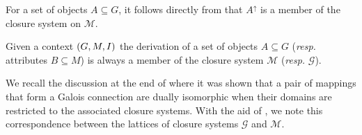 For a set of objects $A \subseteq G$, it follows directly from 
that $A^{\uparrow}$ is a member of the closure system on $\mathcal{M}$.

\begin{corollary}
	\label{corollary:derivation-closure-systems}

	Given a context $(G,M,\mathrel{I})$ the derivation of a set of objects $A \subseteq G$ (\textit{resp.}
	attributes $B \subseteq M$) is always a member of the closure system $\mathcal{M}$
	(\textit{resp.} $\mathcal{G}$).
\end{corollary}

We recall the discussion at the end of 
where it was shown that a pair of mappings that form a Galois connection are
dually isomorphic when their domains are restricted to the associated closure
systems. With the aid of , we note this correspondence
between the lattices of closure systems $\mathcal{G}$ and $\mathcal{M}$.

